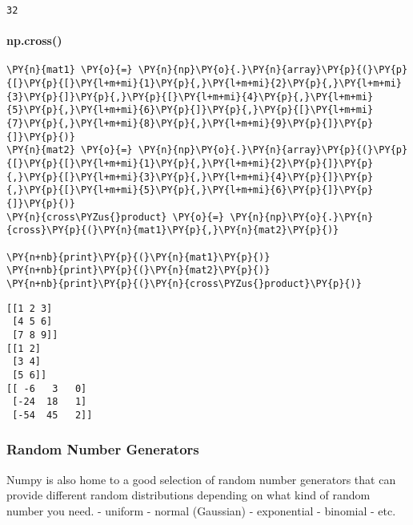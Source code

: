     \begin{Verbatim}[commandchars=\\\{\}]
32
    \end{Verbatim}

    \hypertarget{np.cross}{%
\paragraph{np.cross()}\label{np.cross}}

    \begin{tcolorbox}[breakable, size=fbox, boxrule=1pt, pad at break*=1mm,colback=cellbackground, colframe=cellborder]
\begin{Verbatim}[commandchars=\\\{\}]
\PY{n}{mat1} \PY{o}{=} \PY{n}{np}\PY{o}{.}\PY{n}{array}\PY{p}{(}\PY{p}{[}\PY{p}{[}\PY{l+m+mi}{1}\PY{p}{,}\PY{l+m+mi}{2}\PY{p}{,}\PY{l+m+mi}{3}\PY{p}{]}\PY{p}{,}\PY{p}{[}\PY{l+m+mi}{4}\PY{p}{,}\PY{l+m+mi}{5}\PY{p}{,}\PY{l+m+mi}{6}\PY{p}{]}\PY{p}{,}\PY{p}{[}\PY{l+m+mi}{7}\PY{p}{,}\PY{l+m+mi}{8}\PY{p}{,}\PY{l+m+mi}{9}\PY{p}{]}\PY{p}{]}\PY{p}{)}
\PY{n}{mat2} \PY{o}{=} \PY{n}{np}\PY{o}{.}\PY{n}{array}\PY{p}{(}\PY{p}{[}\PY{p}{[}\PY{l+m+mi}{1}\PY{p}{,}\PY{l+m+mi}{2}\PY{p}{]}\PY{p}{,}\PY{p}{[}\PY{l+m+mi}{3}\PY{p}{,}\PY{l+m+mi}{4}\PY{p}{]}\PY{p}{,}\PY{p}{[}\PY{l+m+mi}{5}\PY{p}{,}\PY{l+m+mi}{6}\PY{p}{]}\PY{p}{]}\PY{p}{)}
\PY{n}{cross\PYZus{}product} \PY{o}{=} \PY{n}{np}\PY{o}{.}\PY{n}{cross}\PY{p}{(}\PY{n}{mat1}\PY{p}{,}\PY{n}{mat2}\PY{p}{)}

\PY{n+nb}{print}\PY{p}{(}\PY{n}{mat1}\PY{p}{)}
\PY{n+nb}{print}\PY{p}{(}\PY{n}{mat2}\PY{p}{)}
\PY{n+nb}{print}\PY{p}{(}\PY{n}{cross\PYZus{}product}\PY{p}{)}
\end{Verbatim}
\end{tcolorbox}

    \begin{Verbatim}[commandchars=\\\{\}]
[[1 2 3]
 [4 5 6]
 [7 8 9]]
[[1 2]
 [3 4]
 [5 6]]
[[ -6   3   0]
 [-24  18   1]
 [-54  45   2]]
    \end{Verbatim}

    \hypertarget{random-number-generators}{%
\subsubsection{Random Number
Generators}\label{random-number-generators}}

Numpy is also home to a good selection of random number generators that
can provide different random distributions depending on what kind of
random number you need. - uniform - normal (Gaussian) - exponential -
binomial - etc.


